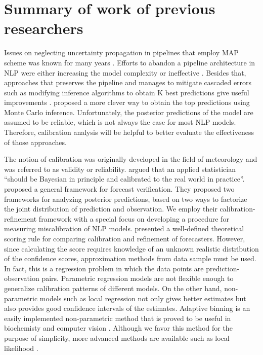 \chapter{Summary of work of previous researchers}
\doublespacenormalsize

Issues on neglecting uncertainty propagation in pipelines that employ MAP scheme was known for many years \citep{draper1995assessment}. Efforts to abandon a pipeline architecture in NLP were either increasing the model complexity \citep{singh2013joint, DurrettKlein2014} or ineffective \citep{sutton2005joint}. Besides that, approaches that preserves the pipeline and manages to mitigate cascaded errors such as modifying inference algorithms to obtain K best predictions give useful improvements \citep{huang2005better, toutanova2005joint}. \cite{finkel2006solving} proposed a more clever way to obtain the top predictions using Monte Carlo inference. Unfortunately, the posterior predictions of the model are assumed to be reliable, which is not always the case for most NLP models. Therefore, calibration analysis will be helpful to better evaluate the effectiveness of those approaches.

The notion of calibration was originally developed in the field of meteorology \citep{miller1962statistical, murphy1973new} and was referred to as validity or reliability. \cite{rubin1984bayesianly} argued that an applied statistician ``should be Bayesian in principle and calibrated to the real world in practice''. \cite{murphy1984probability} proposed a general framework for forecast verification. They proposed two frameworks for analyzing posterior predictions, based on two ways to factorize the joint distribution of prediction and observation. We employ their calibration-refinement framework with a special focus on developing a procedure for measuring miscalibration of NLP models. \cite{degroot1983comparison} presented a well-defined theoretical scoring rule for comparing calibration and refinement of forecasters. However, since calculating the score requires knowledge of an unknown realistic distribution of the confidence scores, approximation methods from data sample must be used. In fact, this is a regression problem in which the data points are prediction-observation pairs. Parametric regression models are not flexible enough to generalize calibration patterns of different models. On the other hand, non-parametric models such as local regression \citep{wasserman2006all} not only gives better estimates but also provides good confidence intervals of the estimates. Adaptive binning is an easily implemented non-parametric method that is proved to be useful in biochemisty and computer vision \citep{davis2007adaptive, leow2004analysis}. Although we favor this method for the purpose of simplicity, more advanced methods are available such as local likelihood \citep{frolich2006non}.  

